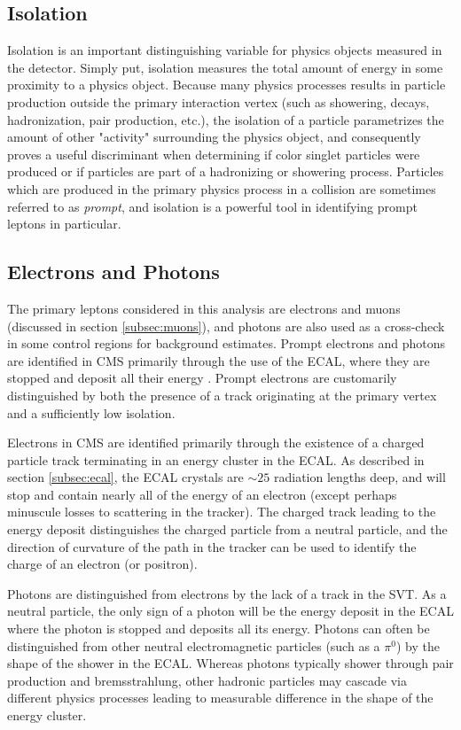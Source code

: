 \subsection{Isolation}
\label{subsec:iso}
Isolation is an important distinguishing variable for physics objects measured in the detector. Simply put, isolation measures the total amount of energy in some proximity to a physics object. Because many physics processes results in particle production outside the primary interaction vertex (such as showering, decays, hadronization, pair production, etc.), the isolation of a particle parametrizes the amount of other "activity" surrounding the physics object, and consequently proves a useful discriminant when determining if color singlet particles were produced or if particles are part of a hadronizing or showering process. Particles which are produced in the primary physics process in a collision are sometimes referred to as {\it prompt}, and isolation is a powerful tool in identifying prompt leptons in particular.

\subsection{Electrons and Photons}
\label{subsec:lepgamme}
The primary leptons considered in this analysis are electrons and muons (discussed in section \ref{subsec:muons}), and photons are also used as a cross-check in some control regions for background estimates. Prompt electrons and photons are identified in CMS primarily through the use of the ECAL, where they are stopped and deposit all their energy \cite{Baffioni:2006cd,Khachatryan:2015iwa}. Prompt electrons are customarily distinguished by both the presence of a track originating at the primary vertex and a sufficiently low isolation.

Electrons in CMS are identified primarily through the existence of a charged particle track terminating in an energy cluster in the ECAL. As described in section \ref{subsec:ecal}, the ECAL crystals are $\sim25$ radiation lengths deep, and will stop and contain nearly all of the energy of an electron (except perhaps minuscule losses to scattering in the tracker). The charged track leading to the energy deposit distinguishes the charged particle from a neutral particle, and the direction of curvature of the path in the tracker can be used to identify the charge of an electron (or positron).

Photons are distinguished from electrons by the lack of a track in the SVT. As a neutral particle, the only sign of a photon will be the energy deposit in the ECAL where the photon is stopped and deposits all its energy. Photons can often be distinguished from other neutral electromagnetic particles (such as a $\pi^0$) by the shape of the shower in the ECAL. Whereas photons typically shower through pair production and bremsstrahlung, other hadronic particles may cascade via different physics processes leading to measurable difference in the shape of the energy cluster.

